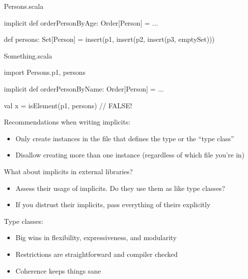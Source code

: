 \documentclass[usenames,dvipsnames,svgnames,table,aspectratio=169,mathserif]{beamer}
\newcommand{\nl}{\vspace{\baselineskip}}
\newcommand{\pnl}{\pause \nl}
\begin{document}
\begin{frame}[fragile]
\begin{block}{Persons.scala}
\begin{scalacode}
implicit def orderPersonByAge: Order[Person] = ...

def persons: Set[Person] =
  insert(p1, insert(p2, insert(p3, emptySet)))
\end{scalacode}
\end{block}

\nl

\begin{block}{Something.scala}
\begin{scalacode}
import Persons.{p1, persons}

implicit def orderPersonByName: Order[Person] = ...

val x = isElement(p1, persons) // FALSE!
\end{scalacode}
\end{block}
\end{frame}


\begin{frame}
Recommendations when writing implicits:
\begin{itemize}
\item Only create instances in the file that defines the type or the ``type class''
\item Disallow creating more than one instance (regardless of which file you're in)
\end{itemize}

\pnl

What about implicits in external libraries?
\begin{itemize}
\item Assess their usage of implicits. Do they use them as like type classes?
\item If you distrust their implicits, pass everything of theirs explicitly
\end{itemize}
\end{frame}


\begin{frame}

Type classes:
\begin{itemize}
\item Big wins in flexibility, expressiveness, and modularity
\item Restrictions are straightforward and compiler checked
\item Coherence keeps things sane
\end{itemize}
\end{frame}
\end{document}
